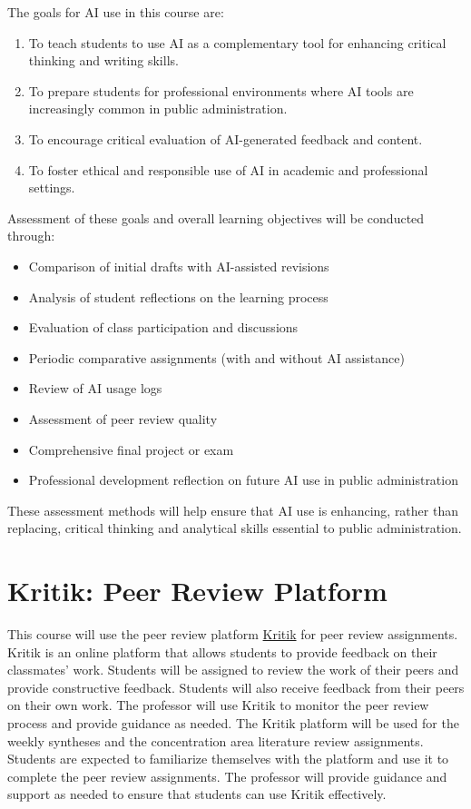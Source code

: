 \documentclass[12pt, letterpaper]{article}
\begin{document}
\noindent The goals for AI use in this course are:

\begin{enumerate}
    \item To teach students to use AI as a complementary tool for enhancing critical thinking and writing skills.
    \item To prepare students for professional environments where AI tools are increasingly common in public administration.
    \item To encourage critical evaluation of AI-generated feedback and content.
    \item To foster ethical and responsible use of AI in academic and professional settings.
\end{enumerate}

\noindent Assessment of these goals and overall learning objectives will be conducted through:

\begin{itemize}
    \item Comparison of initial drafts with AI-assisted revisions
    \item Analysis of student reflections on the learning process
    \item Evaluation of class participation and discussions
    \item Periodic comparative assignments (with and without AI assistance)
    \item Review of AI usage logs
    \item Assessment of peer review quality
    \item Comprehensive final project or exam
    \item Professional development reflection on future AI use in public administration
\end{itemize}

\noindent These assessment methods will help ensure that AI use is enhancing, rather than replacing, critical thinking and analytical skills essential to public administration.

 

\section*{Kritik: Peer Review Platform}

\noindent This course will use the peer review platform \href{https://kritik.io/}{Kritik} for peer review assignments. Kritik is an online platform that allows students to provide feedback on their classmates' work. Students will be assigned to review the work of their peers and provide constructive feedback. Students will also receive feedback from their peers on their own work. The professor will use Kritik to monitor the peer review process and provide guidance as needed.
\vspace{0.5em}
\noindent The Kritik platform will be used for the weekly syntheses and the concentration area literature review assignments. Students are expected to familiarize themselves with the platform and use it to complete the peer review assignments. The professor will provide guidance and support as needed to ensure that students can use Kritik effectively.
\end{document}

